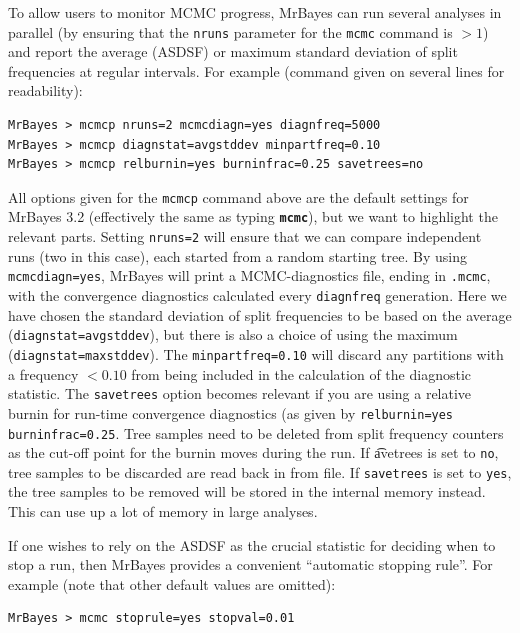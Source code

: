\documentclass[12pt]{book}
\newcommand{\ttt}[1]{\texttt{#1}}
\newcommand{\tb}[1]{\ttt{\textbf{#1}}}
\begin{document}
To allow users to monitor MCMC progress, MrBayes can run several analyses in parallel (by ensuring 
that the \ttt{nruns} parameter for the \ttt{mcmc} command is $>1$) and report the average (ASDSF) or
maximum standard deviation of split frequencies at regular intervals. For example (command given on
several lines for readability):

\footnotesize
\begin{singlespacing}
\begin{verbatim}
MrBayes > mcmcp nruns=2 mcmcdiagn=yes diagnfreq=5000
MrBayes > mcmcp diagnstat=avgstddev minpartfreq=0.10
MrBayes > mcmcp relburnin=yes burninfrac=0.25 savetrees=no
\end{verbatim}
\end{singlespacing}
\normalsize

All options given for the \ttt{mcmcp} command above are the default settings for MrBayes 3.2
(effectively the same as typing \tb{mcmc}), but we want to highlight the relevant parts. Setting
\ttt{nruns=2} will ensure that we can compare independent runs (two in this case), each started
from a random starting tree. By using \ttt{mcmcdiagn=yes}, MrBayes will print a MCMC-diagnostics
file, ending in \ttt{.mcmc}, with the convergence diagnostics calculated every \ttt{diagnfreq}
generation. Here we have chosen the standard deviation of split frequencies to be based on the
average (\ttt{diagnstat=avgstddev}), but there is also a choice of using the maximum
(\ttt{diagnstat=maxstddev}). The \ttt{minpartfreq=0.10} will discard any partitions with a
frequency $<0.10$ from being included in the calculation of the diagnostic statistic. The
\ttt{savetrees} option becomes relevant if you are using a relative burnin for run-time convergence
diagnostics (as given by \ttt{relburnin=yes burninfrac=0.25}. Tree samples need to be deleted from
split frequency counters as the cut-off point for the burnin moves during the run. If \t{avetrees}
is set to \ttt{no}, tree samples to be discarded are read back in from file. If \ttt{savetrees} is
set to \ttt{yes}, the tree samples to be removed will be stored in the internal memory instead.
This can use up a lot of memory in large analyses.

If one wishes to rely on the ASDSF as the crucial statistic for deciding when to stop a run, then
MrBayes provides a convenient ``automatic stopping rule''. For example (note that other default
values are omitted):

\footnotesize
\begin{singlespacing}
\begin{verbatim}
MrBayes > mcmc stoprule=yes stopval=0.01
\end{verbatim}
\end{singlespacing}
\normalsize
\end{document}
